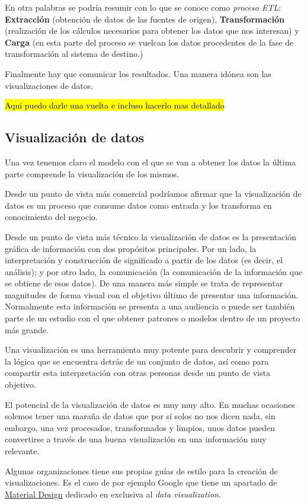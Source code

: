 En otra palabras se podría resumir con lo que se conoce como \textit{proceso ETL}: \textbf{Extracción} (obtención de datos de las fuentes de origen), \textbf{Transformación} (realización de los cálculos necesarios para obtener los datos que nos interesan) y \textbf{Carga} (en esta parte del proceso se vuelcan los datos procedentes de la fase de transformación al sistema de destino.)

Finalmente hay que comunicar los resultados. Una manera idónea son las visualizaciones de datos.

 \hl{Aqui puedo darle una vuelta e incluso hacerlo mas detallado}

\subsection{Visualización de datos}
Una vez tenemos claro el modelo con el que se van a obtener los datos la última parte comprende la visualización de los mismos.

Desde un punto de vista más comercial podríamos afirmar que la visualización de datos es un proceso que consume datos como entrada y los transforma en conocimiento del negocio.

Desde un punto de vista más técnico la visualización de datos es la presentación gráfica de información con dos propósitos principales. Por un lado, la interpretación y construcción de significado a partir de los datos (es decir, el análisis); y por otro lado, la comunicación (la comunicación de la información que se obtiene de esos datos). De una manera más simple se trata de representar magnitudes de forma visual con el objetivo último de presentar una información. Normalmente esta información se presenta a una audiencia o puede ser también parte de un estudio con el que obtener patrones o modelos dentro de un proyecto más grande. 


Una  visualización es una herramienta muy potente para descubrir y comprender la lógica que se encuentra detrás de un conjunto de datos, así como para compartir esta interpretación con otras personas desde un punto de vista objetivo.

El potencial de la visualización de datos es muy muy alto. En muchas ocasiones solemos tener una maraña de datos que por sí solos no nos dicen nada, sin embargo, una vez procesados, transformados y limpios, unos datos pueden convertirse a través de una buena visualización en una información muy relevante.

Algunas organizaciones \cite{cesal_what_2019} tiene sus propias guías de estilo para la creación de visualizaciones. Es el caso de por ejemplo Google que tiene un apartado de \href{https://material.io/design/communication/data-visualization.html#types}{Material Design} dedicado en exclusiva al \textit{data visualization}.
